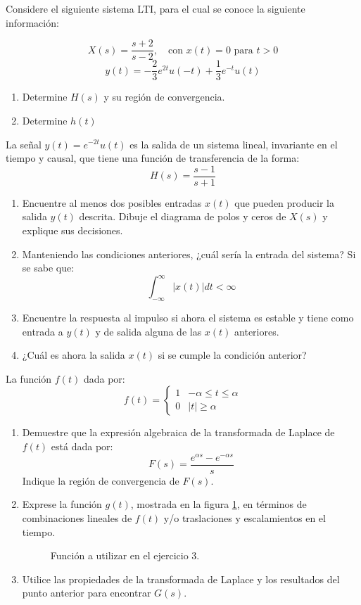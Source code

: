 \begin{ejercicio}
	Considere el siguiente sistema LTI, para el cual se conoce la siguiente información:
	\begin{figure}[!h]
		\centering
		
	\end{figure}
	$$ X(s) = \frac{s+2}{s-2}, \quad \text{con $x(t)=0$ para $t>0$} $$
	$$ y(t) = -\frac{2}{3}e^{2t}u(-t)+\frac{1}{3}e^{-t}u(t) $$
	\begin{enumerate}
		\item Determine $H(s)$ y su región de convergencia.
		\item Determine $h(t)$
	\end{enumerate}
\end{ejercicio}

\begin{ejercicio}
	La señal $y(t)=e^{-2t}u(t)$ es la salida de un sistema lineal, invariante en el tiempo y causal, que tiene una función de transferencia de la forma:
	$$ H(s) = \frac{s-1}{s+1} $$
	\begin{enumerate}
		\item Encuentre al menos dos posibles entradas $x(t)$ que pueden producir la salida $y(t)$ descrita. Dibuje el diagrama de polos y ceros de $X(s)$ y explique sus decisiones.
		\item Manteniendo las condiciones anteriores, ¿cuál sería la entrada del sistema? Si se sabe que:
		$$ \int_{-\infty}^{\infty} |x(t)| dt < \infty $$
		\item Encuentre la respuesta al impulso si ahora el sistema es estable y tiene como entrada a $y(t)$ y de salida alguna de las $x(t)$ anteriores.
		\item ¿Cuál es ahora la salida $x(t)$ si se cumple la condición anterior?
	\end{enumerate}
\end{ejercicio}

\begin{ejercicio}
	La función $f(t)$ dada por:
	$$ f(t) = \left\{
	\begin{array}{ll}
		1 & -\alpha \leq t \leq \alpha\\
		0 & |t|\geq \alpha
	\end{array}
	\right .
	$$
	\begin{enumerate}
		\item Demuestre que la expresión algebraica de la transformada de Laplace de $f(t)$ está dada por:
			$$ F(s) = \frac{e^{\alpha s}-e^{-\alpha s}}{s} $$
		Indique la región de convergencia de $F(s)$.
		\item Exprese la función $g(t)$, mostrada en la figura \ref{fig:g}, en términos de combinaciones lineales de $f(t)$ y/o traslaciones y escalamientos en el tiempo.
		\begin{figure}[!h]
			\centering
			
			\caption{Función a utilizar en el ejercicio 3.}
			\label{fig:g}
		\end{figure}
		\item Utilice las propiedades de la transformada de Laplace y los resultados del punto anterior para encontrar $G(s)$.
	\end{enumerate}
\end{ejercicio}

